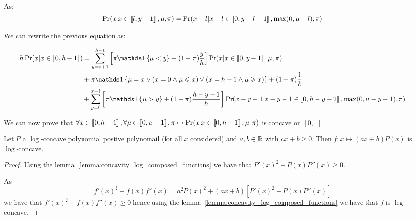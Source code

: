 As:
\begin{equation}
    \Pr(x | x \in \left\llbracket l, y - 1\right\rrbracket, \mu, \pi) = \Pr(x - l | x - l \in \left\llbracket0, y - l - 1\right\rrbracket, \max(0, \mu - l), \pi)
\end{equation}

We can rewrite the previous equation as:

\begin{align}
    h\Pr(x | x \in \bbrack{0, h - 1})
    &= \sum_{y = x + 1}^{h - 1} \left[ \pi \indickronecker{\mu < y} + (1-\pi) \frac{y}{h} \right] \Pr(x | x \in \bbrack{0, y - 1}, \mu, \pi) \\
    &+ \pi \indickronecker{\mu = x \lor (x = 0 \land \mu \leq x) \lor (x = h - 1 \land \mu \geq x)} + (1 - \pi) \frac{1}{h} \\
    &+ \sum_{y = 0}^{x - 1} \left[ \pi \indickronecker{\mu > y} + (1-\pi) \frac{h - y - 1}{h} \right] \Pr(x - y - 1 | x - y - 1 \in \bbrack{0, h - y - 2}, \max(0, \mu - y - 1), \pi)
\end{align}


We can now prove that $\forall x \in \left\llbracket0, h - 1\right\rrbracket, \forall \mu \in \left\llbracket0, h - 1\right\rrbracket, \pi \mapsto \Pr(x | x \in \left\llbracket0, h - 1\right\rrbracket, \mu, \pi)$ is concave on $[0, 1]$


\begin{lemma}
    \label{lemma:concavity_log_polynomial_times_affine}
    Let $P$ a $\log$-concave polynomial postive polynomail (for all $x$ considered) and $a, b \in \mathbb{R}$ with $ax + b \geq 0$. Then $f: x \mapsto (ax + b)P(x)$ is $\log$-concave.
\end{lemma}
\begin{proof}
    Using the lemma~\ref{lemma:concavity_log_composed_functions} we have that $P'(x)^2 - P(x)P''(x) \geq 0$.
    
    As
    \[f'(x)^2 - f(x) f''(x) = a^2 P(x)^2 + (ax + b) \left[ P'(x)^2 - P(x)P''(x) \right] \] 
    we have that $f'(x)^2 - f(x) f''(x) \geq 0$ hence using the lemma~\ref{lemma:concavity_log_composed_functions} we have that $f$ is $\log$-concave.
\end{proof}


